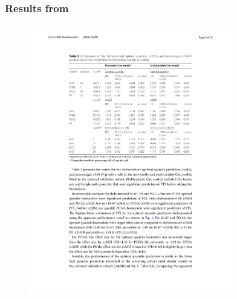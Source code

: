 \documentclass[t,8pt]{beamer}
\begin{document}
\frame
   {\frametitle{Results from \cite{Yi23BMC}}  

\begin{figure}
                \includegraphics[width=3.5in] {Figures/Yi_et_al_BMC_Bioinf_2023.pdf}
 \end{figure} 

}
\end{document}
